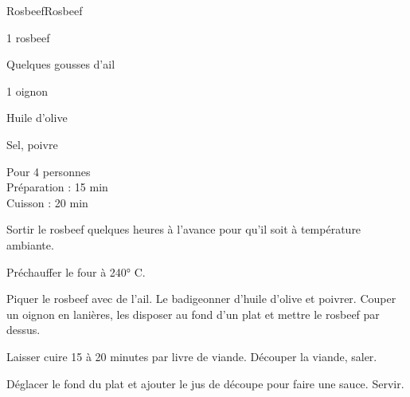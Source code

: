 \begin{recette}{Rosbeef}{Rosbeef}

\begin{ingredients}
1 rosbeef\par
Quelques gousses d'ail\par
1 oignon\par
Huile d'olive\par
Sel, poivre\par
\end{ingredients}

\begin{infos}
Pour 4 personnes\\
Préparation : 15 min\\
Cuisson : 20 min\\
\end{infos}

\begin{etapes}
\item Sortir le rosbeef quelques heures à l'avance pour qu'il soit à température ambiante.
\item Préchauffer le four à 240° C.
\item Piquer le rosbeef avec de l'ail. Le badigeonner d'huile d'olive et poivrer. Couper un oignon en lanières, les disposer au fond d'un plat et mettre le rosbeef par dessus.
\item Laisser cuire 15 à 20 minutes par livre de viande. Découper la viande, saler.
\item Déglacer le fond du plat et ajouter le jus de découpe pour faire une sauce. Servir.
\end{etapes}

\end{recette}